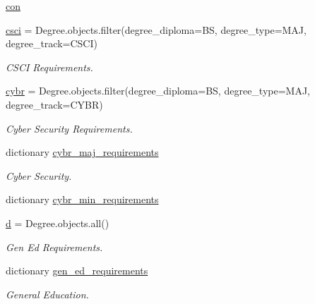 \begin{DoxyCompactItemize}
\mbox{\hyperlink{namespacemavAgenda_1_1RequirementPreprocessing_ad63f688072e5be75854ab9d4371ce7b2}{con}}
\item 
\mbox{\hyperlink{namespacemavAgenda_1_1RequirementPreprocessing_a1981c721791f4f2441162665525dffc1}{csci}} = Degree.\+objects.\+filter(degree\+\_\+diploma=\textquotesingle{}BS\textquotesingle{}, degree\+\_\+type=\textquotesingle{}M\+AJ\textquotesingle{}, degree\+\_\+track=\textquotesingle{}C\+S\+CI\textquotesingle{})
\begin{DoxyCompactList}\small\item\em C\+S\+CI Requirements. \end{DoxyCompactList}\item 
\mbox{\hyperlink{namespacemavAgenda_1_1RequirementPreprocessing_ad7cf7d47ad0cfa6bc49f64afeac2513b}{cybr}} = Degree.\+objects.\+filter(degree\+\_\+diploma=\textquotesingle{}BS\textquotesingle{}, degree\+\_\+type=\textquotesingle{}M\+AJ\textquotesingle{}, degree\+\_\+track=\textquotesingle{}C\+Y\+BR\textquotesingle{})
\begin{DoxyCompactList}\small\item\em Cyber Security Requirements. \end{DoxyCompactList}\item 
dictionary \mbox{\hyperlink{namespacemavAgenda_1_1RequirementPreprocessing_ae6ef10b512ef3afb1ff5e4cd56501a46}{cybr\+\_\+maj\+\_\+requirements}}
\begin{DoxyCompactList}\small\item\em Cyber Security. \end{DoxyCompactList}\item 
dictionary \mbox{\hyperlink{namespacemavAgenda_1_1RequirementPreprocessing_a81f8244b0823bb403303f4a441891f16}{cybr\+\_\+min\+\_\+requirements}}
\item 
\mbox{\hyperlink{namespacemavAgenda_1_1RequirementPreprocessing_afb09ed787f26710dd4bc556a0a850114}{d}} = Degree.\+objects.\+all()
\begin{DoxyCompactList}\small\item\em Gen Ed Requirements. \end{DoxyCompactList}\item 
dictionary \mbox{\hyperlink{namespacemavAgenda_1_1RequirementPreprocessing_a77979346bcc0af61a1840b0c69addb7a}{gen\+\_\+ed\+\_\+requirements}}
\begin{DoxyCompactList}\small\item\em General Education. \end{DoxyCompactList}\item 

\end{DoxyCompactItemize}
